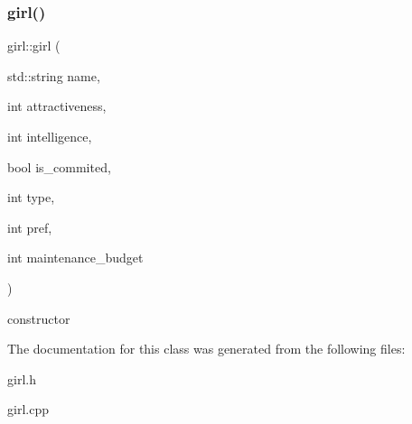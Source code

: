 \subsubsection{\texorpdfstring{girl()}{girl()}}
{\footnotesize\ttfamily girl\+::girl (\begin{DoxyParamCaption}\item[{std\+::string}]{name,  }\item[{int}]{attractiveness,  }\item[{int}]{intelligence,  }\item[{bool}]{is\+\_\+commited,  }\item[{int}]{type,  }\item[{int}]{pref,  }\item[{int}]{maintenance\+\_\+budget }\end{DoxyParamCaption})}

constructor 

The documentation for this class was generated from the following files\+:\begin{DoxyCompactItemize}
\item 
girl.\+h\item 
girl.\+cpp\end{DoxyCompactItemize}
